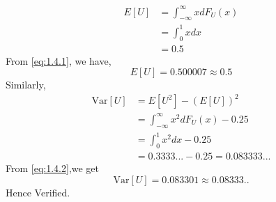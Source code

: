 \documentclass[journal,12pt,twocolumn]{IEEEtran}
\renewcommand\thesection{\arabic{section}}
\begin{document}
\begin{enumerate}[label=\thesection.\arabic*.,ref=\thesection.\theenumi]
    \begin{align}
        E[U] &= \int_{-\infty}^{\infty} xdF_U(x) \\
        &= \int_{0}^1 x dx \\
        &=  0.5
    \end{align}
    From \eqref{eq:1.4.1}, we have, 
    \begin{equation}
        E[U] = 0.500007 \approx 0.5
    \end{equation}
    Similarly,
    \begin{align}
        \text{Var}[U]&=E[U^2]-(E[U])^2 \\
        &=\int_{-\infty}^{\infty}x^2dF_U(x) - 0.25\\
        &=\int_{0}^{1}x^2dx - 0.25\\
        &=0.3333...-0.25=0.083333...
    \end{align}
    From \eqref{eq:1.4.2},we get
    \begin{equation}
        \text{Var}[U] = 0.083301 \approx 0.08333..
    \end{equation}
    Hence Verified.
\end{enumerate}
\end{document}
